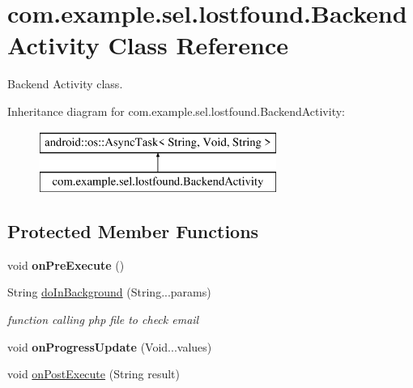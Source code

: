 \hypertarget{classcom_1_1example_1_1sel_1_1lostfound_1_1BackendActivity}{}\section{com.\+example.\+sel.\+lostfound.\+Backend\+Activity Class Reference}
\label{classcom_1_1example_1_1sel_1_1lostfound_1_1BackendActivity}


Backend Activity class.  


Inheritance diagram for com.\+example.\+sel.\+lostfound.\+Backend\+Activity\+:\begin{figure}[H]
\begin{center}
\leavevmode
\includegraphics[height=2.000000cm]{classcom_1_1example_1_1sel_1_1lostfound_1_1BackendActivity}
\end{center}
\end{figure}
\subsection*{Protected Member Functions}
\begin{DoxyCompactItemize}
\item 
void {\bfseries on\+Pre\+Execute} ()\hypertarget{classcom_1_1example_1_1sel_1_1lostfound_1_1BackendActivity_a679cd5822b3d0b71b8a947eab9ff6c79}{}\label{classcom_1_1example_1_1sel_1_1lostfound_1_1BackendActivity_a679cd5822b3d0b71b8a947eab9ff6c79}

\item 
String \hyperlink{classcom_1_1example_1_1sel_1_1lostfound_1_1BackendActivity_a4e9c46f342ba6738cdd50c9c75fb3ec7}{do\+In\+Background} (String...\+params)
\begin{DoxyCompactList}\small\item\em function calling php file to check email \end{DoxyCompactList}\item 
void {\bfseries on\+Progress\+Update} (Void...\+values)\hypertarget{classcom_1_1example_1_1sel_1_1lostfound_1_1BackendActivity_a6a2bf0fca03b89c35cd48befe848ee8d}{}\label{classcom_1_1example_1_1sel_1_1lostfound_1_1BackendActivity_a6a2bf0fca03b89c35cd48befe848ee8d}

\item 
void \hyperlink{classcom_1_1example_1_1sel_1_1lostfound_1_1BackendActivity_aa2e67993396f2bf74577e6ff84e16b44}{on\+Post\+Execute} (String result)
\end{DoxyCompactItemize}


